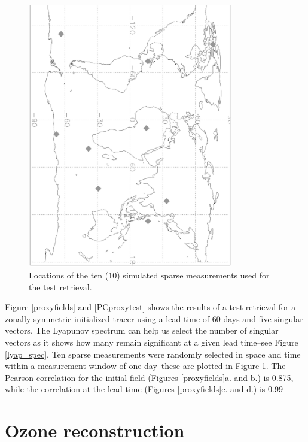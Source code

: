 \documentclass{article}
\begin{document}
\begin{figure}
\begin{center}
\includegraphics[angle=90,width=0.8\textwidth]{../pc_proxy/meas_loc.eps}
\caption{Locations of the ten (10) simulated sparse measurements used for the
test retrieval.}\label{sparse}
\end{center}
\end{figure}

Figure \ref{proxyfields} and \ref{PCproxytest} 
shows the results of a test retrieval for a 
zonally-symmetric-initialized tracer using a lead time of 60 days
and five singular vectors.
The Lyapunov spectrum can help us select the number of singular vectors
as it shows how many remain significant at
a given lead time--see Figure \ref{lyap_spec}.
Ten sparse measurements were randomly selected in space and time
within a measurement window of one day--these are plotted in Figure \ref{sparse}.
The Pearson correlation for the initial field (Figures \ref{proxyfields}a. and b.)
is 0.875, while the correlation at the lead time 
(Figures \ref{proxyfields}c. and d.) is 0.99

\section{Ozone reconstruction}
\end{document}
